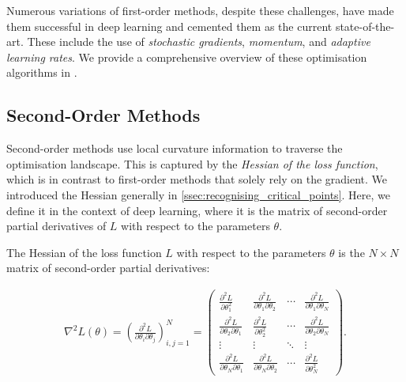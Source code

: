 Numerous variations of first-order methods, despite these challenges, have made them successful in deep learning and cemented them as the current state-of-the-art. These include the use of \textit{stochastic gradients}, \textit{momentum}, and \textit{adaptive learning rates}. We provide a comprehensive overview of these optimisation algorithms in .



\subsection{Second-Order Methods}

\label{ssec:second_order_methods}



Second-order methods use local curvature information to traverse the optimisation landscape. This is captured by the \textit{Hessian of the loss function}, which is in contrast to first-order methods that solely rely on the gradient. We introduced the Hessian generally in \cref{ssec:recognising_critical_points}. Here, we define it in the context of deep learning, where it is the matrix of second-order partial derivatives of $L$ with respect to the parameters $\theta$.

\begin{definition}

    The Hessian of the loss function $L$ with respect to the parameters $\theta$ is the $N \times N$ matrix of second-order partial derivatives:

    \begin{align}

        \nabla^2 L(\theta) = \left(\frac{\partial^2 L}{\partial \theta_i \partial \theta_j}\right)_{i,j=1}^N = 

        \begin{pmatrix}

            \frac{\partial^2 L}{\partial \theta_1^2} & \frac{\partial^2 L}{\partial \theta_1 \partial \theta_2} & \cdots & \frac{\partial^2 L}{\partial \theta_1 \partial \theta_N} \\

            \frac{\partial^2 L}{\partial \theta_2 \partial \theta_1} & \frac{\partial^2 L}{\partial \theta_2^2} & \cdots & \frac{\partial^2 L}{\partial \theta_2 \partial \theta_N} \\

            \vdots & \vdots & \ddots & \vdots \\

            \frac{\partial^2 L}{\partial \theta_N \partial \theta_1} & \frac{\partial^2 L}{\partial \theta_N \partial \theta_2} & \cdots & \frac{\partial^2 L}{\partial \theta_N^2}

        \end{pmatrix}.

    \end{align}

\end{definition}

